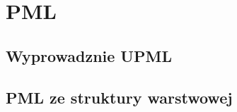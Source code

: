 \chapter{PML}
\label{roz:pml}

\section{Wyprowadznie UPML}

\section{PML ze struktury warstwowej~\cite{ania2015}}

